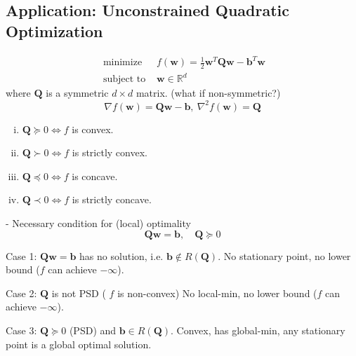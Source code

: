 \documentclass[11pt,a4paper]{article}
\begin{document}
\subsection{Application: Unconstrained Quadratic Optimization}
$$\begin{array}{ll}\text { minimize } & f(\mathbf{w})=\frac{1}{2} \mathbf{w}^{T} \mathbf{Q} \mathbf{w}-\mathbf{b}^{T} \mathbf{w} \\ \text { subject to } & \mathbf{w} \in \mathbb{R}^{d}\end{array}$$
where $\mathbf{Q}$ is a symmetric $d \times d$ matrix. (what if non-symmetric?)
$$\nabla f(\mathbf{w})=\mathbf{Q}\mathbf{w}-\mathbf{b},\ \nabla^2 f(\mathbf{w})=\mathbf{Q}$$
\begin{enumerate}[(i)]
    \item $\mathbf{Q}\succeq 0 \Leftrightarrow	f$ is convex.
    \item $\mathbf{Q}\succ 0 \Leftrightarrow	f$ is strictly convex.
    \item $\mathbf{Q}\preceq 0 \Leftrightarrow	f$ is concave.
    \item $\mathbf{Q}\prec 0 \Leftrightarrow	f$ is strictly concave.
\end{enumerate}









- Necessary condition for (local) optimality
$$
\mathbf{Q} \mathbf{w}=\mathbf{b}, \quad \mathbf{Q} \succeq 0
$$

Case 1: $\mathbf{Q w}=\mathbf{b}$ has no solution, i.e. $\mathbf{b} \notin R(\mathbf{Q})$. No stationary point, no lower bound ($f$ can achieve $-\infty$).

Case 2: $\mathbf{Q}$ is not PSD ( $f$ is non-convex)
No local-min, no lower bound ($f$ can achieve $-\infty$).

Case 3: $\mathbf{Q} \succeq 0$ (PSD) and $\mathbf{b} \in R(\mathbf{Q})$. Convex, has global-min, 
any stationary point is a global optimal solution.
\end{document}
